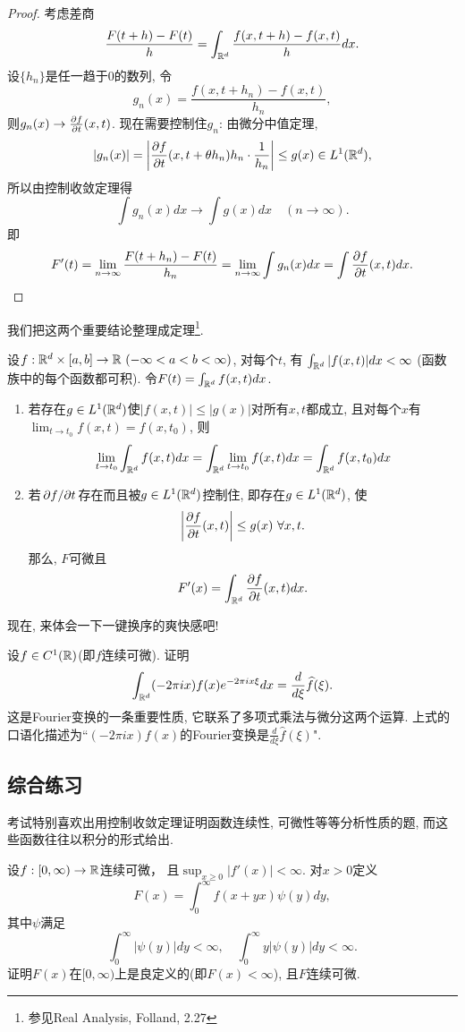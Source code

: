 \begin{proof}
    考虑差商
    $$\frac{F(t+h)-F(t)}{h} = \int_{\mathbb{R}^d} \frac{f(x,t+h)-f(x,t)}{h}
      dx. $$
    设$\{h_n\}$是任一趋于$0$的数列, 令
    $$g_n(x)=\frac{f(x, t+h_n)-f(x,t)}{h_n},$$
    则$g_n(x) \to {\pdv{f}{t}}(x,t)$. 现在需要控制住$g_n$: 由微分中值定理, 
    $$|g_n(x)|=\left|{\pdv{f}{t}}(x, t+\theta h_n)h_n \cdot \frac{1}{h_n}\right| \leq g(x) \in L^1(\mathbb{R}^d),$$
    所以由控制收敛定理得
    $$\int g_n(x)dx \to \int g(x)dx \quad (n \to \infty).$$
    即
    $$F'(t)=\lim_{n \to \infty}\frac{F(t+h_n)-F(t)}{h_n}=
    \lim_{n \to \infty}\int g_n(x)dx = \int {\pdv{f}{t}}(x,t)dx. $$
\end{proof}
我们把这两个重要结论整理成定理\footnote{参见Real Analysis, Folland, 2.27}.
\begin{theorem}[一键换序]
    设$f:\mathbb{R}^d \times [a,b] \to \mathbb{R} ~(-\infty<a<b<\infty)$, 对每个$t$, 有
    $\int_{\mathbb{R}^d} |f(x,t)|dx < \infty~$(函数族中的每个函数都可积). 令$F(t)=\int_{\mathbb{R}^d} f(x,t)dx$.
    \begin{enumerate}
    \item 若存在$g \in L^1(\mathbb{R}^d)$使$|f(x,t)| \leq |g(x)|$对所有$x,t$都成立, 且对每个$x$有$\lim_{t\to t_0}f(x,t)=f(x,t_0)$, 则
    $$\lim_{t\to t_0} \int_{\mathbb{R}^d} f(x,t)dx = \int_{\mathbb{R}^d} \lim_{t\to t_0} f(x,t)dx = \int_{\mathbb{R}^d} f(x,t_0)dx$$
    \item 若$\pdv*{f}{t}$存在而且被$g \in L^1(\mathbb{R}^d)$控制住, 即存在$g \in L^1(\mathbb{R}^d)$, 使
    $$\left|{\pdv{f}{t}}(x,t) \right| \leq g(x) ~\forall x,t.$$
    那么, $F$可微且
    $$F'(x)=\int_{\mathbb{R}^d} {\pdv{f}{t}}(x,t) dx.$$
    \end{enumerate}
\end{theorem}
现在, 来体会一下一键换序的爽快感吧!
\begin{exercise}
    设$f \in C^1(\mathbb{R})$(即$f$连续可微). 证明
    $$\int_{\mathbb{R}^d} (-2\pi ix)f(x)e^{-2\pi i x\xi} dx 
      = \frac{d}{d\xi}\widehat{f}(\xi). $$
    这是Fourier变换的一条重要性质, 它联系了多项式乘法与微分这两个运算. 
    上式的口语化描述为``$(-2\pi ix)f(x)$的Fourier变换是$\frac{d}{d\xi}\hat{f}(\xi)$".
\end{exercise}

\subsection{综合练习}
考试特别喜欢出用控制收敛定理证明函数连续性, 可微性等等分析性质的题, 而这些函数往往以积分的形式给出. 

\begin{exercise} %
    设$f:[0,\infty) \to \mathbb{R}$连续可微， 且$\sup_{x \geq 0}|f'(x)|<\infty$. 对$x>0$定义
    $$F(x) = \int_0^\infty f(x+yx)\psi(y)dy,$$
    其中$\psi$满足
    $$\int_0^\infty |\psi(y)|dy < \infty, \quad \int_0^\infty y|\psi(y)|dy < \infty.$$    
    证明$F(x)$在$[0,\infty)$上是良定义的(即$F(x)<\infty$), 且$F$连续可微.
\end{exercise}

